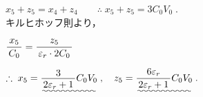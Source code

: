 ﻿\documentclass[../../../ps_a.tex]{subfiles}
\begin{document}
\begin{enumerate}
            \myspaceb%
            $\displaystyle%
                x_5 + z_5 = x_4 + z_4
                \qquad \therefore \; x_5 + z_5 = 3C_0 V_0 \;.
            $\\
            キルヒホッフ則より，
            
            \myspaceb%
            $\displaystyle%
                \myfracc{x_5}{C_0} = \myfracc{z_5}{\varepsilon_r \cdot 2C_0} 
            $

            \myspaceb%
            $\displaystyle%
                \therefore \; x_5 = \uwave{\myfraca{3}{2\varepsilon_r + 1} C_0 V_0} \;,%
                \quad z_5 = \uwave{\myfracc{6\varepsilon_r}{2\varepsilon_r + 1} C_0 V_0} \;.
            $            
    \end{enumerate}
\end{document}

